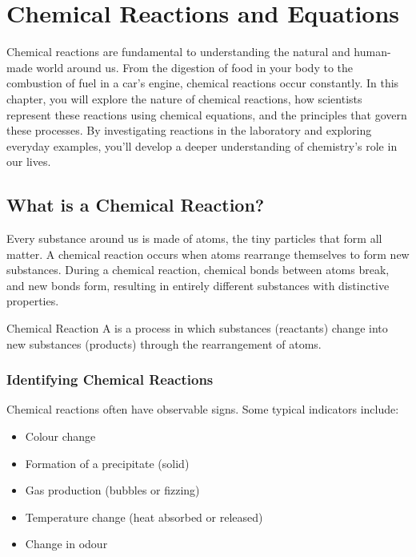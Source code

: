 \chapter{Chemical Reactions and Equations}

Chemical reactions are fundamental to understanding the natural and human-made world around us. From the digestion of food in your body to the combustion of fuel in a car’s engine, chemical reactions occur constantly. In this chapter, you will explore the nature of chemical reactions, how scientists represent these reactions using chemical equations, and the principles that govern these processes. By investigating reactions in the laboratory and exploring everyday examples, you'll develop a deeper understanding of chemistry's role in our lives.

\section{What is a Chemical Reaction?}

Every substance around us is made of atoms, the tiny particles that form all matter. A chemical reaction occurs when atoms rearrange themselves to form new substances. During a chemical reaction, chemical bonds between atoms break, and new bonds form, resulting in entirely different substances with distinctive properties.

\begin{marginfigure}
\centering
\caption{Atoms rearrange to form new substances during chemical reactions.}
\label{fig:atoms_reaction}
\end{marginfigure}

\begin{keyconcept}{Chemical Reaction}
A  is a process in which substances (reactants) change into new substances (products) through the rearrangement of atoms.
\end{keyconcept}

\subsection{Identifying Chemical Reactions}

Chemical reactions often have observable signs. Some typical indicators include:

\begin{itemize}
    \item Colour change
    \item Formation of a precipitate (solid)
    \item Gas production (bubbles or fizzing)
    \item Temperature change (heat absorbed or released)
    \item Change in odour
\end{itemize}

